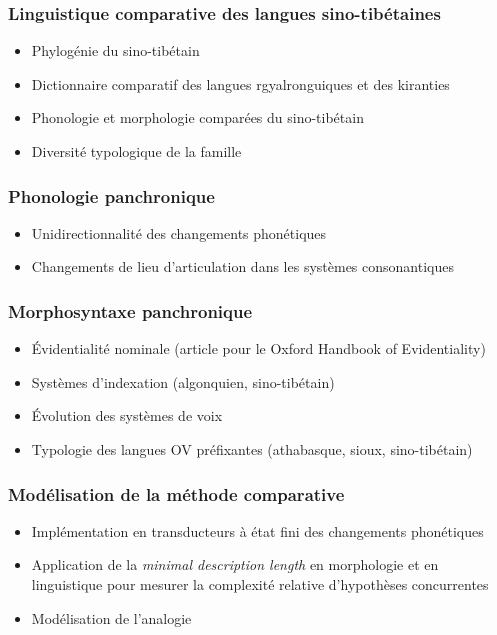 \documentclass[xcolor=table]{beamer}
\begin{document}
   \begin{frame} 
 \frametitle{Linguistique comparative des langues sino-tibétaines} 
 \begin{itemize}%
 \item Phylogénie du sino-tibétain
  \item Dictionnaire comparatif des langues rgyalronguiques et des kiranties
  \item Phonologie et morphologie comparées du sino-tibétain
 \item Diversité typologique de la famille 
\end{itemize}
   \end{frame} 

   \begin{frame} 
 \frametitle{Phonologie panchronique} 
 \begin{itemize}%
 \item Unidirectionnalité des changements phonétiques
 \item Changements de lieu d'articulation dans les systèmes consonantiques
\end{itemize}
   \end{frame} 

   \begin{frame} 
 \frametitle{Morphosyntaxe panchronique} 
 \begin{itemize}%
 \item Évidentialité nominale (article pour le Oxford Handbook of Evidentiality)
 \item Systèmes d'indexation (algonquien, sino-tibétain)
 \item Évolution des systèmes de voix
 \item Typologie des langues OV préfixantes (athabasque, sioux, sino-tibétain)
\end{itemize}
   \end{frame} 

   \begin{frame} 
 \frametitle{Modélisation de la méthode comparative} 
 \begin{itemize}%
 \item  Implémentation en transducteurs à état fini des changements phonétiques
  \item Application de la \textit{minimal description length} en morphologie et en linguistique pour mesurer la complexité relative d'hypothèses concurrentes
  \item Modélisation de l'analogie
\end{itemize}
   \end{frame} 
\end{document}
